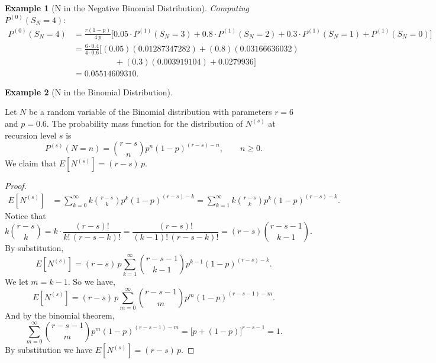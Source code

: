 \documentclass[11pt]{amsart}
\theoremstyle{definition}
\newtheorem{example}{Example}
\theoremstyle{plain}
\begin{document}
\begin{example}[N in the Negative Binomial Distribution]
\medskip
\noindent\textit{Computing} $P^{(0)}(S_N = 4)$:
\begin{align*}
P^{(0)}(S_N = 4)
    &= \frac{r(1-p)}{4\,p}
       \bigl[0.05 \cdot P^{(1)}(S_N = 3) + 0.8 \cdot P^{(1)}(S_N = 2)
       + 0.3 \cdot P^{(1)}(S_N = 1) + P^{(1)}(S_N = 0)\bigr] \\
    &= \frac{6 \cdot 0.4}{4 \cdot 0.6}
       \bigl[(0.05)(0.01287347282) + (0.8)(0.03166636032) \\
    &\qquad\qquad\quad + (0.3)(0.003919104) + 0.0279936\bigr] \\
    &= \boxed{0.05514609310}.
\end{align*}
\end{example}

\begin{example}[N in the Binomial Distribution]\label{ex:binom}
Let $N$ be a random variable of the Binomial distribution with parameters $r = 6$ and
$p = 0.6$.  The probability mass function for the distribution of $N^{(s)}$ at recursion
level $s$ is
\[
    P^{(s)}(N = n) = \binom{r - s}{n} p^n (1-p)^{(r-s)-n},
    \qquad n \geq 0.
\]
We claim that $E[N^{(s)}] = (r - s)\,p$.

\begin{proof}
\begin{align*}
E[N^{(s)}]
    &= \sum_{k=0}^{\infty} k \binom{r-s}{k} p^k (1-p)^{(r-s)-k}
     = \sum_{k=1}^{\infty} k \binom{r-s}{k} p^k (1-p)^{(r-s)-k}.
\end{align*}
Notice that
\[
    k \binom{r-s}{k}
    = k \cdot \frac{(r-s)!}{k!\,(r-s-k)!}
    = \frac{(r-s)!}{(k-1)!\,(r-s-k)!}
    = (r-s)\binom{r-s-1}{k-1}.
\]
By substitution,
\[
    E[N^{(s)}]
    = (r-s)\,p \sum_{k=1}^{\infty} \binom{r-s-1}{k-1} p^{k-1}(1-p)^{(r-s)-k}.
\]
We let $m = k - 1$.  So we have,
\[
    E[N^{(s)}]
    = (r-s)\,p \sum_{m=0}^{\infty}
      \binom{r-s-1}{m} p^m (1-p)^{(r-s-1)-m}.
\]
And by the binomial theorem,
\[
    \sum_{m=0}^{\infty} \binom{r-s-1}{m} p^m (1-p)^{(r-s-1)-m}
    = \bigl[p + (1-p)\bigr]^{r-s-1} = 1.
\]
By substitution we have $E[N^{(s)}] = (r-s)\,p$. \qedhere
\end{proof}


\end{example}
\end{document}
